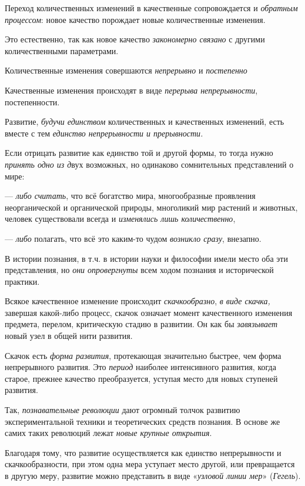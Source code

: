 \documentclass[a4paper,14pt,russian]{extreport}
\begin{document}
Переход количественных изменений в качественные сопровождается и \emph{обратным процессом}: новое качество порождает новые количественные изменения.

Это естественно, так как новое качество \emph{закономерно связано} с другими количественными параметрами.

Количественные изменения совершаются \emph{непрерывно} и \emph{постепенно}

Качественные изменения происходят в виде \emph{перерыва непрерывности}, постепенности.

Развитие, \emph{будучи единством} количественных и качественных изменений, есть вместе с тем \emph{единство непрерывности и прерывности.}

Если отрицать развитие как единство той и другой формы, то тогда нужно \emph{принять одно из д}вух возможных, но одинаково сомнительных представлений о мире:

--- \emph{либо считать}, что всё богатство мира, многообразные проявления неорганической и органической природы, многоликий мир растений и животных, человек существовали всегда и \emph{изменялись лишь количественно},

--- \emph{либо} полагать, что всё это каким-то чудом \emph{возникло сразу}, внезапно.

В истории познания, в т.ч. в истории науки и философии имели место оба эти представления, но \emph{они опровергнуты} всем ходом познания и исторической практики.

Всякое качественное изменение происходит \emph{скачкообразно}, \emph{в виде скачка,} завершая какой-либо процесс, скачок означает момент качественного изменения предмета, перелом, критическую стадию в развитии. Он как бы \emph{завязывает} новый узел в общей нити развития.

Скачок есть \emph{форма развития}, протекающая значительно быстрее, чем форма непрерывного развития. Это \emph{период} наиболее интенсивного развития, когда старое, прежнее качество преобразуется, уступая место для новых ступеней развития.

Так, \emph{познавательные революции} дают огромный толчок развитию экспериментальной техники и теоретических средств познания. В основе же самих таких революций лежат \emph{новые крупные открытия}.

Благодаря тому, что развитие осуществляется как единство непрерывности и скачкообразности, при этом одна мера уступает место другой, или превращается в другую меру, развитие можно представить в виде «\emph{узловой линии мер}» (\emph{Гегель}).
\end{document}
